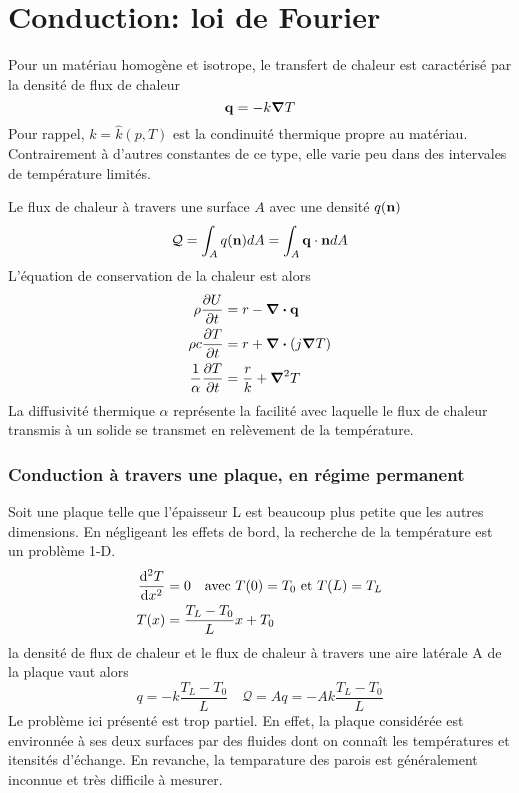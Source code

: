 \documentclass[a4paper,11pt]{report}
\newcommand{\recip}[1]{\frac{1}{#1}}
\begin{document}
    \section{Conduction: loi de Fourier}
      Pour un matériau homogène et isotrope, le transfert de chaleur est caractérisé par la densité de flux de chaleur
      \begin{equation}
        \vb{q} = - k \grad T
      \end{equation}
      Pour rappel, $k = \hat{k}(p, T)$ est la condinuité thermique propre au matériau. Contrairement à d'autres constantes de ce type, elle varie peu dans des intervales de température limités.

      Le flux de chaleur à travers une surface $A$ avec une densité $q(\vb{n})$
      \begin{equation}
        \mathcal{Q} = \int_A q(\vb{n}) dA = \int_A \vb{q} \cdot \vb{n} dA
      \end{equation}
      L'équation de conservation de la chaleur est alors
      \begin{equation}
        \begin{aligned}
          \rho \pdv{U}{t} &= r - \div \vb{q}\\
          \rho c \pdv{T}{t} &= r +  \div (j \grad T)\\
          \recip{\alpha} \pdv{T}{t} &= \frac{r}{k} + \grad^2 T
        \end{aligned}
      \end{equation}
      La diffusivité thermique $\alpha$ représente la facilité avec laquelle le flux de chaleur transmis à un solide se transmet en relèvement de la température.

      \subsubsection{Conduction à travers une plaque, en régime permanent}
        Soit une plaque telle que l'épaisseur L est beaucoup plus petite que les autres dimensions. En négligeant les effets de bord, la recherche de la température est un problème 1-D.
        \begin{equation}
          \begin{aligned}
            \dv[2]{T}{x} &= 0 \quad \textrm{avec } T(0) = T_0 \textrm{ et } T(L) = T_L\\
            T(x) &= \frac{T_L - T_0}{L} x + T_0
          \end{aligned}
        \end{equation}
        la densité de flux de chaleur et le flux de chaleur à travers une aire latérale A de la plaque vaut alors
        \begin{equation}
          q = -k \frac{T_L - T_0}{L} \quad \mathcal{Q} = Aq = -A k \frac{T_L - T_0}{L}
        \end{equation}
        Le problème ici présenté est trop partiel. En effet, la plaque considérée est environnée à ses deux surfaces par des fluides dont on connaît les températures et itensités d'échange. En revanche, la temparature des parois est généralement inconnue et très difficile à mesurer.
\end{document}
